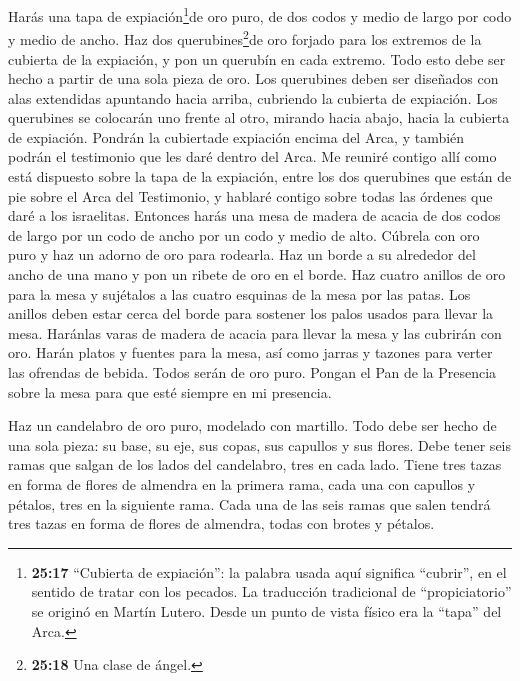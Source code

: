  Harás una tapa de expiación\footnote{\textbf{25:17}
  ``Cubierta de expiación'': la palabra usada aquí significa ``cubrir'',
  en el sentido de tratar con los pecados. La traducción tradicional de
  ``propiciatorio'' se originó en Martín Lutero. Desde un punto de vista
  físico era la ``tapa'' del Arca.}de oro puro, de dos codos y medio de
largo por codo y medio de ancho.  Haz dos
querubines\footnote{\textbf{25:18} Una clase de ángel.}de oro forjado
para los extremos de la cubierta de la expiación,  y pon un
querubín en cada extremo. Todo esto debe ser hecho a partir de una sola
pieza de oro.  Los querubines deben ser diseñados con alas
extendidas apuntando hacia arriba, cubriendo la cubierta de expiación.
Los querubines se colocarán uno frente al otro, mirando hacia abajo,
hacia la cubierta de expiación.  Pondrán la cubiertade
expiación encima del Arca, y también podrán el testimonio que les daré
dentro del Arca.  Me reuniré contigo allí como está
dispuesto sobre la tapa de la expiación, entre los dos querubines que
están de pie sobre el Arca del Testimonio, y hablaré contigo sobre todas
las órdenes que daré a los israelitas.  Entonces harás una
mesa de madera de acacia de dos codos de largo por un codo de ancho por
un codo y medio de alto.  Cúbrela con oro puro y haz un
adorno de oro para rodearla.  Haz un borde a su alrededor
del ancho de una mano y pon un ribete de oro en el borde. 
Haz cuatro anillos de oro para la mesa y sujétalos a las cuatro esquinas
de la mesa por las patas.  Los anillos deben estar cerca
del borde para sostener los palos usados para llevar la mesa.
 Haránlas varas de madera de acacia para llevar la mesa y
las cubrirán con oro.  Harán platos y fuentes para la mesa,
así como jarras y tazones para verter las ofrendas de bebida. Todos
serán de oro puro.  Pongan el Pan de la Presencia sobre la
mesa para que esté siempre en mi presencia.

 Haz un candelabro de oro puro, modelado con martillo. Todo
debe ser hecho de una sola pieza: su base, su eje, sus copas, sus
capullos y sus flores.  Debe tener seis ramas que salgan de
los lados del candelabro, tres en cada lado.  Tiene tres
tazas en forma de flores de almendra en la primera rama, cada una con
capullos y pétalos, tres en la siguiente rama. Cada una de las seis
ramas que salen tendrá tres tazas en forma de flores de almendra, todas
con brotes y pétalos.

